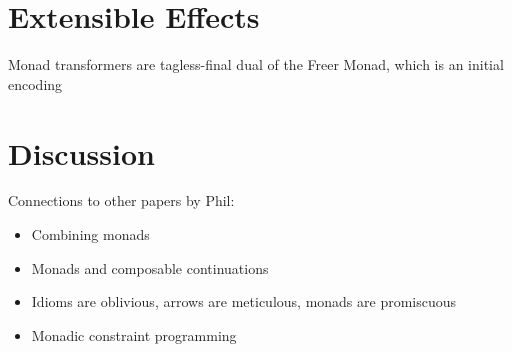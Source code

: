 \documentclass{llncs}
\begin{document}
\section{Extensible Effects}

Monad transformers are tagless-final dual of the Freer Monad, which is
an initial encoding

\section{Discussion}

Connections to other papers by Phil:  
\begin{itemize}
  \item Combining monads
  \item Monads and composable continuations
  \item Idioms are oblivious, arrows are meticulous, monads are promiscuous
  \item Monadic constraint programming
\end{itemize}




\end{document}
